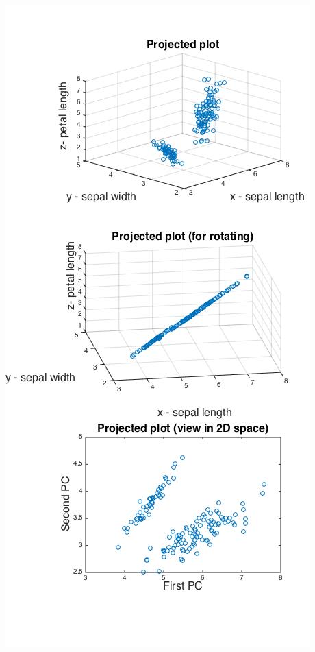 \documentclass[paper=a4, fontsize=11pt]{scrartcl} %
\numberwithin{equation}{section} %
\numberwithin{figure}{section} %
\numberwithin{table}{section} %
\begin{document}
\begin{center}
\includegraphics[scale=.46]{Xscatters_projected.jpg}
\end{center}
\end{document}
